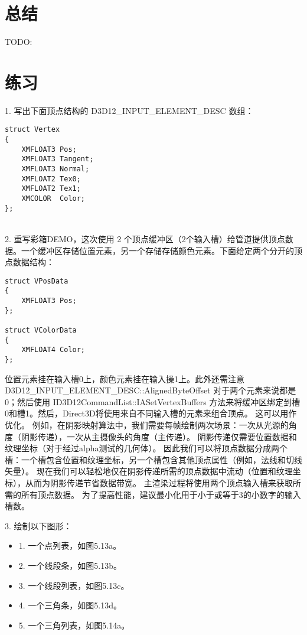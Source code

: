 \section{总结}
TODO:

\section{练习}
\begin{flushleft}
1. 写出下面顶点结构的 D3D12\_INPUT\_ELEMENT\_DESC 数组：
\end{flushleft}
\begin{lstlisting}
struct Vertex
{
    XMFLOAT3 Pos;
    XMFLOAT3 Tangent;
    XMFLOAT3 Normal;
    XMFLOAT2 Tex0;
    XMFLOAT2 Tex1;
    XMCOLOR  Color;
};
\end{lstlisting}

\begin{flushleft}
~\\
2. 重写彩箱DEMO，这次使用 2 个顶点缓冲区（2个输入槽）给管道提供顶点数据。一个缓冲区存储位置元素，另一个存储存储颜色元素。下面给定两个分开的顶点数据结构：\\
\end{flushleft}
\begin{lstlisting}
struct VPosData
{
    XMFLOAT3 Pos;
};

struct VColorData
{
    XMFLOAT4 Color;
};
\end{lstlisting}
\begin{flushleft}
位置元素挂在输入槽0上，颜色元素挂在输入操1上。此外还需注意 D3D12\_INPUT\_ELEMENT\_DESC::AlignedByteOffset 对于两个元素来说都是0；然后使用 ID3D12CommandList::IASetVertexBuffers 方法来将缓冲区绑定到槽0和槽1。然后，Direct3D将使用来自不同输入槽的元素来组合顶点。 这可以用作优化。 例如，在阴影映射算法中，我们需要每帧绘制两次场景：一次从光源的角度（阴影传递），一次从主摄像头的角度（主传递）。 阴影传递仅需要位置数据和纹理坐标（对于经过alpha测试的几何体）。 因此我们可以将顶点数据分成两个槽：一个槽包含位置和纹理坐标，另一个槽包含其他顶点属性（例如，法线和切线矢量）。 现在我们可以轻松地仅在阴影传递所需的顶点数据中流动（位置和纹理坐标），从而为阴影传递节省数据带宽。 主渲染过程将使用两个顶点输入槽来获取所需的所有顶点数据。 为了提高性能，建议最小化用于小于或等于3的小数字的输入槽数。\\
\end{flushleft}

\begin{flushleft}
3. 绘制以下图形：\\
\begin{itemize}
  \item 1. 一个点列表，如图5.13a。
  \item 2. 一个线段条，如图5.13b。
  \item 3. 一个线段列表，如图5.13c。
  \item 4. 一个三角条，如图5.13d。
  \item 5. 一个三角列表，如图5.14a。
\end{itemize}
\end{flushleft}

